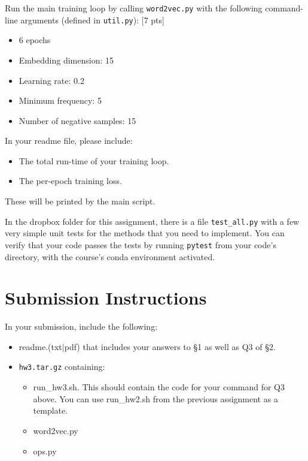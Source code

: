 \documentclass[11pt]{article}
\begin{document}
\vspace{2em}
 Run the main training loop by calling \texttt{word2vec.py} with the following command-line arguments (defined in \texttt{util.py}): [7 pts]
\begin{itemize}
  \item 6 epochs
  \item Embedding dimension: 15
  \item Learning rate: 0.2
  \item Minimum frequency: 5
  \item Number of negative samples: 15
\end{itemize}
In your readme file, please include: 
\begin{itemize}
  \item The total run-time of your training loop.  
  \item The per-epoch training loss. 
\end{itemize}
These will be printed by the main script.


\vspace{2em}
 In the dropbox folder for this assignment, there is a file \texttt{test\_all.py} with a few very simple unit tests for the methods that you need to implement.  You can verify that your code passes the tests by running \texttt{pytest} from your code's directory, with the course's conda environment activated.


\section*{Submission Instructions}

In your submission, include the following:
\begin{itemize}
  \item readme.(txt$\mid$pdf) that includes your answers to \S1 as well as Q3 of \S2. 
  \item \texttt{hw3.tar.gz} containing:
  \begin{itemize}
    \item run\_hw3.sh.  This should contain the code for your command for Q3 above.  You can use run\_hw2.sh from the previous assignment as a template.
    \item word2vec.py
    \item ops.py
  \end{itemize}
\end{itemize}
\end{document}

